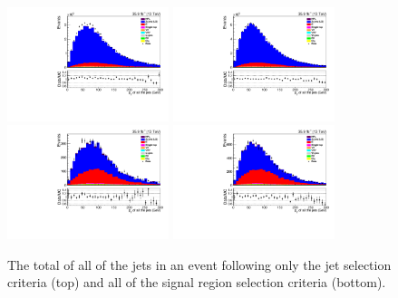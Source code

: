 \begin{figure}[ht]
\centering
\includegraphics[width=0.42\textwidth]{figs/background-estimation/plots/unblinded/prompt_ee_ttbarInc/totalJetPt_NPL_ee_jetSel_ee.pdf}
\includegraphics[width=0.42\textwidth]{figs/background-estimation/plots/unblinded/prompt_mumu_ttbarInc/totalJetPt_NPL_mumu_jetSel_mumu.pdf}
\\
\includegraphics[width=0.42\textwidth]{figs/background-estimation/plots/unblinded/prompt_ee_ttbarInc/totalJetPt_NPL_ee_wMass_ee.pdf}
\includegraphics[width=0.42\textwidth]{figs/background-estimation/plots/unblinded/prompt_mumu_ttbarInc/totalJetPt_NPL_mumu_wMass_mumu.pdf}
\caption{
The total \pT of all of the jets in an event following only the jet selection criteria (top) and all of the signal region selection criteria (bottom).
}
\label{fig:App_SR_totalJetPt}
\end{figure}

